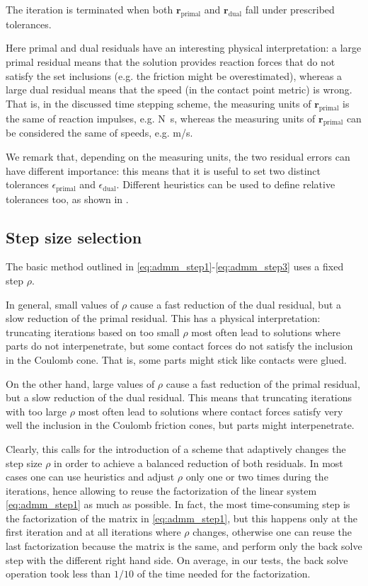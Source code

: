 \documentclass[AMA,STIX1COL]{WileyNJD-v2}
\newcommand{\vect}[1]{\bm{#1}}
\begin{document}
The iteration is terminated when both $\vect{r}_{\text{primal}}$ and $\vect{r}_{\text{dual}}$ fall under prescribed tolerances. 

Here primal and dual residuals have an interesting physical interpretation: a large primal residual means that the solution provides reaction forces that do not satisfy the set inclusions (e.g. the friction might be overestimated), whereas a large dual residual means that the speed (in the contact point metric) is wrong. That is, in the discussed time stepping scheme, the measuring units of $\vect{r}_{\text{primal}}$ is the same of reaction impulses, e.g. \si{N.s}, whereas the measuring units of $\vect{r}_{\text{primal}}$ can be considered the same of speeds, e.g. \si{m/s}.

We remark that, depending on the measuring units, the two residual errors can have different importance: this means that it is useful to set two distinct tolerances $\epsilon_{\text{primal}}$ and $\epsilon_{\text{dual}}$. Different heuristics can be used to define relative tolerances too, as shown in \cite{Stellato2020}.


\subsection{Step size selection}

The basic method outlined in \eqref{eq:admm_step1}-\eqref{eq:admm_step3} uses a fixed step $\rho$. 

In general, small values of $\rho$ cause a fast reduction of the dual residual, but a slow reduction of the primal residual. This has a  physical interpretation: truncating iterations based on too small $\rho$ most often lead to solutions where parts do not interpenetrate, but some contact forces do not satisfy the inclusion in the Coulomb cone. That is, some parts might stick like contacts were glued.

On the other hand, large values of $\rho$ cause a fast reduction of the primal residual, but a slow reduction of the dual residual. This means that truncating iterations with too large $\rho$ most often lead to solutions where contact forces satisfy very well the inclusion in the Coulomb friction cones, but parts might interpenetrate.
 
Clearly, this calls for the introduction of a scheme that adaptively changes the step size $\rho$ in order to achieve a balanced reduction of both residuals.
In most cases one can use heuristics and adjust $\rho$ only one or two times during the iterations, hence allowing to reuse the factorization of the linear system \eqref{eq:admm_step1} as much as possible. In fact, the most time-consuming step is the factorization of the matrix in \eqref{eq:admm_step1}, but this happens only at the first iteration and at all iterations where $\rho$ changes, otherwise one can reuse the last factorization because the matrix is the same, and perform only the back solve step with the different right hand side. On average, in our tests, the back solve operation took less than $1/10$ of the time needed for the factorization. 
\end{document}
